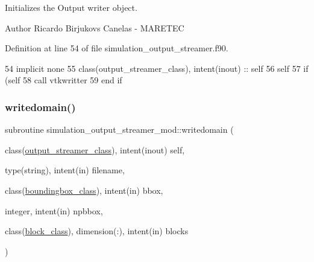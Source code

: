 Initializes the Output writer object. 

\begin{DoxyAuthor}{Author}
Ricardo Birjukovs Canelas -\/ M\+A\+R\+E\+T\+EC 
\end{DoxyAuthor}


Definition at line 54 of file simulation\+\_\+output\+\_\+streamer.\+f90.


\begin{DoxyCode}
54     \textcolor{keywordtype}{implicit none}
55     \textcolor{keywordtype}{class}(output\_streamer\_class), \textcolor{keywordtype}{intent(inout)} :: self
56     self%
57     \textcolor{keywordflow}{if} (self%
58         \textcolor{keyword}{call }vtkwritter%
59 \textcolor{keywordflow}{    end if}
\end{DoxyCode}
\mbox{\label{namespacesimulation__output__streamer__mod_a1df8126a96e9b81ddf62841587728663}} 
\subsubsection{\texorpdfstring{writedomain()}{writedomain()}}
{\footnotesize\ttfamily subroutine simulation\+\_\+output\+\_\+streamer\+\_\+mod\+::writedomain (\begin{DoxyParamCaption}\item[{class(\mbox{\hyperlink{structsimulation__output__streamer__mod_1_1output__streamer__class}{output\+\_\+streamer\+\_\+class}}), intent(inout)}]{self,  }\item[{type(string), intent(in)}]{filename,  }\item[{class(\mbox{\hyperlink{structboundingbox__mod_1_1boundingbox__class}{boundingbox\+\_\+class}}), intent(in)}]{bbox,  }\item[{integer, intent(in)}]{npbbox,  }\item[{class(\mbox{\hyperlink{structblocks__mod_1_1block__class}{block\+\_\+class}}), dimension(\+:), intent(in)}]{blocks }\end{DoxyParamCaption})\hspace{0.3cm}{\ttfamily [private]}}



